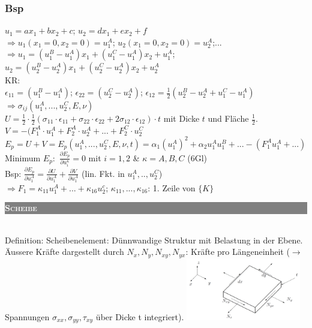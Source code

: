 \documentclass[a4paper,10pt]{article}
\newcommand{\uone}[2]{\colorbox{gray}{\textcolor{white}{\parbox{\linewidth-2.4}{\scshape{\medium\textbf{#1}} }}}\\}
\begin{document}
\begin{multicols}{3}
        \subsubsection{Bsp}
            $u_1=ax_1+bx_2+c$; $u_2=dx_1+ex_2+f$\\
            $\Rightarrow u_1(x_1=0,x_2=0)=u_1^A$; $u_2(x_1=0,x_2=0)=u_2^A$;...\\
            $\Rightarrow u_1=(u_1^B-u_1^A)x_1+(u_1^C-u_1^A)x_2+u_1^A$;\\
            $u_2=(u_2^B-u_2^A)x_1+(u_2^C-u_2^A)x_2+u_2^A$\\
            KR:\\
            $\epsilon_{11}=(u_1^B-u_1^A)$; $\epsilon_{22}=(u_2^C-u_2^A)$; $\epsilon_{12}=\frac{1}{2}(u_2^B-u_2^A+u_1^C-u_1^A)$
            $\Rightarrow\sigma_{ij}(u_1^A,...,u_2^C,E,\nu)$\\
            $U=\frac{1}{2}\cdot\frac{1}{2}(\sigma_{11}\cdot\epsilon_{11}+\sigma_{22}\cdot\epsilon_{22}+2\sigma_{12}\cdot\epsilon_{12})\cdot t$ mit Dicke $t$ und Fläche $\frac{1}{2}$.\\
            $V=-(F_1^A\cdot u_1^A+F_2^A\cdot u_2^A+...+F_2^C\cdot u_2^C$\\
            $E_p=U+V=E_p(u_1^A,...,u_2^C,E,\nu,t)=\alpha_1(u_1^A)^2+\alpha_2u_1^Au_1^B+ ...-(F_1^Au_1^A+...)$\\
            Minimum $E_p:$ $\frac{\partial E_p}{\partial u_i^\kappa}=0$ mit $i=1,2$ \& $\kappa=A,B,C$ (6Gl)\\
            Bsp: $\frac{\partial E_p}{\partial u_1^A}=\frac{\partial U}{\partial u_1^A}+\frac{\partial V}{\partial u_1^A}$ (lin. Fkt. in $u_1^A,..,u_2^C$) \\$\Rightarrow F_1=\kappa_{11}u_1^A+...+\kappa_{16}u_2^c$; $\kappa_{11},...,\kappa_{16}$: 1. Zeile von $\{K\}$

\uone{Scheibe}
    \subsection{Definition:}
        Scheibenelement: Dünnwandige Struktur mit Belastung in der Ebene. Äussere Kräfte dargestellt durch $N_x,N_y,N_{xy},N_{yx}$: Kräfte pro Längeneinheit ($\rightarrow$ Spannungen $\sigma_{xx},\sigma_{yy},\tau_{xy}$ über Dicke t integriert).
        \includegraphics[width=50mm]{Balkenelement.jpeg}

\end{multicols}
\end{document}
